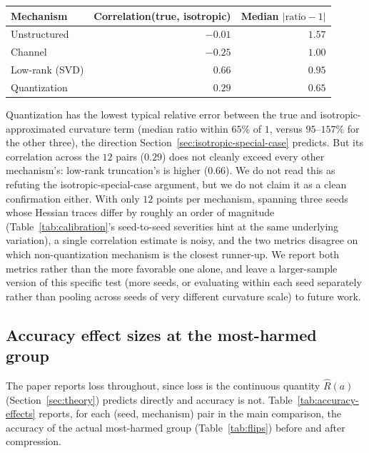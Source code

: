 \documentclass{article}
\begin{document}
\begin{center}
\begin{tabular}{@{}lrr@{}}
\toprule
Mechanism & Correlation(true, isotropic) & Median $|\text{ratio}-1|$ \\
\midrule
Unstructured & $-0.01$ & $1.57$ \\
Channel & $-0.25$ & $1.00$ \\
Low-rank (SVD) & $0.66$ & $0.95$ \\
Quantization & $0.29$ & $\mathbf{0.65}$ \\
\bottomrule
\end{tabular}
\end{center}

Quantization has the lowest typical relative error between the true and isotropic-approximated curvature term (median ratio within $65\%$ of $1$, versus $95$--$157\%$ for the other three), the direction Section~\ref{sec:isotropic-special-case} predicts. But its correlation across the $12$ pairs ($0.29$) does not cleanly exceed every other mechanism's: low-rank truncation's is higher ($0.66$). We do not read this as refuting the isotropic-special-case argument, but we do not claim it as a clean confirmation either. With only $12$ points per mechanism, spanning three seeds whose Hessian traces differ by roughly an order of magnitude (Table~\ref{tab:calibration}'s seed-to-seed severities hint at the same underlying variation), a single correlation estimate is noisy, and the two metrics disagree on which non-quantization mechanism is the closest runner-up. We report both metrics rather than the more favorable one alone, and leave a larger-sample version of this specific test (more seeds, or evaluating within each seed separately rather than pooling across seeds of very different curvature scale) to future work.

\subsection{Accuracy effect sizes at the most-harmed group}
\label{app:accuracy-effect-sizes}

The paper reports loss throughout, since loss is the continuous quantity $\widehat{R}(a)$ (Section~\ref{sec:theory}) predicts directly and accuracy is not. Table~\ref{tab:accuracy-effects} reports, for each (seed, mechanism) pair in the main comparison, the accuracy of the actual most-harmed group (Table~\ref{tab:flips}) before and after compression.
\end{document}
